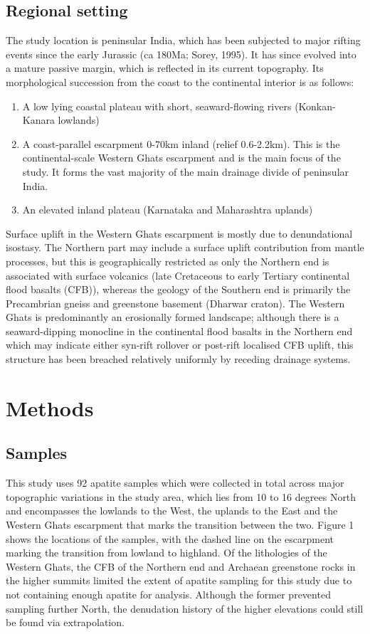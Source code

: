 \documentclass[11pt, oneside]{article}   	%
\begin{document}
\subsection{Regional setting}
The study location is peninsular India, which has been subjected to major rifting events since the early Jurassic (ca 180Ma; Sorey, 1995).
It has since evolved into a mature passive margin, which is reflected in its current topography. Its morphological succession from the coast to the continental interior is as follows:
\begin{enumerate}
        \item A low lying coastal plateau with short, seaward-flowing rivers (Konkan-Kanara lowlands)
        \item A coast-parallel escarpment 0-70km inland (relief 0.6-2.2km). This is the continental-scale Western Ghats escarpment and is the main focus of the study. It forms the vast majority of the main drainage divide of peninsular India.
        \item An elevated inland plateau (Karnataka and Maharashtra uplands)
\end{enumerate}
Surface uplift in the Western Ghats escarpment is mostly due to denundational isostasy. The Northern part may include a surface uplift contribution from mantle processes, but this is geographically restricted as only the Northern end is associated with surface volcanics (late Cretaceous to early Tertiary continental flood basalts (CFB)), whereas the geology of the Southern end is primarily the Precambrian gneiss and greenstone basement (Dharwar craton). 
The Western Ghats is predominantly an erosionally formed landscape; although there is a seaward-dipping monocline in the continental flood basalts in the Northern end which may indicate either syn-rift rollover or post-rift localised CFB uplift, this structure has been breached relatively uniformly by receding drainage systems.
\section{Methods}
\subsection{Samples}
This study uses 92 apatite samples which were collected in total across major topographic variations in the study area, which lies from 10 to 16 degrees North and encompasses the lowlands to the West, the uplands to the East and the Western Ghats escarpment that marks the transition between the two. Figure 1 shows the locations of the samples, with the dashed line on the escarpment marking the transition from lowland to highland. Of the lithologies of the Western Ghats, the CFB of the Northern end and Archaean greenstone rocks in the higher summits limited the extent of apatite sampling for this study due to not containing enough apatite for analysis. Although the former prevented sampling further North, the denudation history of the higher elevations could still be found via extrapolation. 
\end{document}
